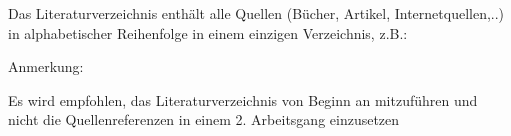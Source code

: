 \begingroup
\let\clearpage\relax
\printbibliography[heading=bibnumbered] 
\endgroup

\noindent Das Literaturverzeichnis enthält alle Quellen (Bücher, Artikel, Internetquellen,..) in alphabetischer Reihenfolge in einem einzigen Verzeichnis, z.B.: 

\noindent Anmerkung: 

\noindent Es wird empfohlen, das Literaturverzeichnis von Beginn an mitzuführen und nicht die Quellenreferenzen in einem 2. Arbeitsgang einzusetzen

\newpage